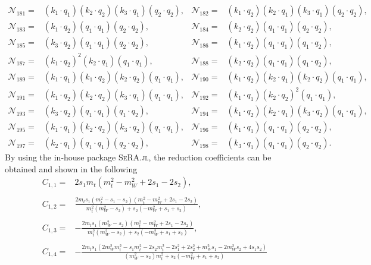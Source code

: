 \documentclass[twocolumn,aps,showpacs,nofootinbib,superscriptaddress,prd]{revtex4-2}
\begin{document}
\begin{widetext}
\begin{align}
{\mathcal N}_{181}=&(k_1\cdot q_1) (k_2\cdot q_2) (k_3\cdot q_1) (q_2\cdot q_2),&
{\mathcal N}_{182}=&(k_1\cdot q_2) (k_2\cdot q_1) (k_3\cdot q_1) (q_2\cdot q_2),\nonumber\\
{\mathcal N}_{183}=&(k_1\cdot q_2) (q_1\cdot q_1) (q_2\cdot q_2),&
{\mathcal N}_{184}=&(k_2\cdot q_2) (q_1\cdot q_1) (q_2\cdot q_2),\nonumber\\
{\mathcal N}_{185}=&(k_3\cdot q_2) (q_1\cdot q_1) (q_2\cdot q_2),&
{\mathcal N}_{186}=&(k_1\cdot q_2) (q_1\cdot q_1) (q_1\cdot q_2),\nonumber\\
{\mathcal N}_{187}=&(k_1\cdot q_2)^2 (k_2\cdot q_1) (q_1\cdot q_1),&
{\mathcal N}_{188}=&(k_2\cdot q_2) (q_1\cdot q_1) (q_1\cdot q_2),\nonumber\\
{\mathcal N}_{189}=&(k_1\cdot q_1) (k_1\cdot q_2) (k_2\cdot q_2) (q_1\cdot q_1),&
{\mathcal N}_{190}=&(k_1\cdot q_2) (k_2\cdot q_1) (k_2\cdot q_2) (q_1\cdot q_1),\nonumber\\
{\mathcal N}_{191}=&(k_1\cdot q_2) (k_2\cdot q_2) (k_3\cdot q_1) (q_1\cdot q_1),&
{\mathcal N}_{192}=&(k_1\cdot q_1) (k_2\cdot q_2)^2 (q_1\cdot q_1),\nonumber\\
{\mathcal N}_{193}=&(k_3\cdot q_2) (q_1\cdot q_1) (q_1\cdot q_2),&
{\mathcal N}_{194}=&(k_1\cdot q_2) (k_2\cdot q_1) (k_3\cdot q_2) (q_1\cdot q_1),\nonumber\\
{\mathcal N}_{195}=&(k_1\cdot q_1) (k_2\cdot q_2) (k_3\cdot q_2) (q_1\cdot q_1),&
{\mathcal N}_{196}=&(k_1\cdot q_1) (q_1\cdot q_1) (q_2\cdot q_2),\nonumber\\
{\mathcal N}_{197}=&(k_2\cdot q_1) (q_1\cdot q_1) (q_2\cdot q_2),&
{\mathcal N}_{198}=&(k_3\cdot q_1) (q_1\cdot q_1) (q_2\cdot q_2).
\end{align}
By using the in-house package \textsc{SeRA.jl}, the reduction coefficients can be obtained and shown in the following
\begin{align}
C_{1,1}=&2s_1m_t\left(m_t^2-m_W^2+2s_1-2s_2\right)
,\nonumber\\
\nonumber\\
C_{1,2}=&\frac{2m_ts_1\left(m_t^2-s_1-s_2\right)\left(m_t^2-m_W^2+2s_1-2s_2\right)}{m_t^2\left(m_W^2-s_2\right)+s_2
\left(-m_W^2+s_1+s_2\right)}
,\nonumber\\
\nonumber\\
C_{1,3}=&-\frac{2m_ts_1\left(m_W^2-s_2\right)\left(m_t^2-m_W^2+2s_1-2s_2\right)}{m_t^2\left(m_W^2-s_2\right)+s_2
\left(-m_W^2+s_1+s_2\right)}
,\nonumber\\
\nonumber\\
C_{1,4}=&-\frac{2m_ts_1\left(2m_W^2m_t^2-s_1m_t^2-2s_2m_t^2-2s_1^2+2s_2^2+m_W^2s_1-2m_W^2s_2+4s_1s_2\right)}{\left(m_W^2-s_2\right)m_t^2+s_2\left(-m_W^2+s_1+s_2\right)}

\end{align}
\end{widetext}
\end{document}
